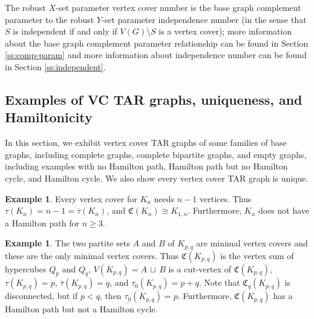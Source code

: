 \documentclass{article}
\numberwithin{figure}{section}
\numberwithin{table}{section}
\numberwithin{equation}{section}
\theoremstyle{definition}
\theoremstyle{definition}
\theoremstyle{definition}
\newtheorem{ex}[thm]{Example}
\newcommand {\du} {\,\sqcup\,}
\newcommand{\ol}{\overline}
\newcommand{\vc}{\tau}
\newcommand{\vcbar}{\ol\vc}
\newcommand{\vctar}{\mathfrak{C}}%
\newcommand{\vco}{\tau_0}
\newcommand{\ulvco}{\underline{\tau_0}}
\begin{document}
{ %

The robust $X$-set parameter vertex cover number is the base graph complement parameter to the robust $Y$-set parameter independence number (in the sense that $S$ is independent if and only if $V(G)\setminus S$ is a vertex cover);  more information about the base graph complement parameter relationship can be found in Section \ref{ss:comp-param} and more information about independence number  can be found in Section \ref{ss:independent}.

\subsection{Examples of VC TAR graphs, uniqueness, and  Hamiltonicity}\label{ss:vcex}

 In this section, 
 we exhibit vertex cover TAR graphs of some families of base graphs, including  complete graphs, complete bipartite graphs,  and empty graphs, including examples with no Hamilton path, Hamilton path but no Hamilton cycle, and Hamilton cycle.    We also show every vertex cover TAR graph is unique.
 
\begin{ex}
    Every  vertex cover for $K_n$ needs $n-1$ vertices.  Thus $\vc(K_{n})=n-1=\vcbar(K_{n})$, and  $\vctar(K_n)\cong K_{1,n}$.  Furthermore, $K_n$ does not have a Hamilton path for $n\ge 3$.
\end{ex}

\begin{ex}\label{ex:vc-Kpq}
The   two partite sets $A$ and $B$  of $K_{p,q}$ are minimal vertex covers and these are the only minimal vertex covers. Thus $\vctar(K_{p,q})$ is the vertex sum of hypercubes  $Q_p$ and $Q_q$,  $V(K_{p,q})=A\du B$ is a cut-vertex of $\vctar(K_{p,q})$, $\vc(K_{p,q})=p$,  $\vcbar(K_{p,q})=q$, and  $\vco(K_{p,q})=p+q$.  Note that $\vctar_q(K_{p,q})$ is disconnected, but if $p<q$, then $\ulvco(K_{p,q})=p$. Furthermore, 
$\vctar(K_{p,q})$ has a Hamilton path but not a Hamilton cycle.
\end{ex}

}
\end{document}
